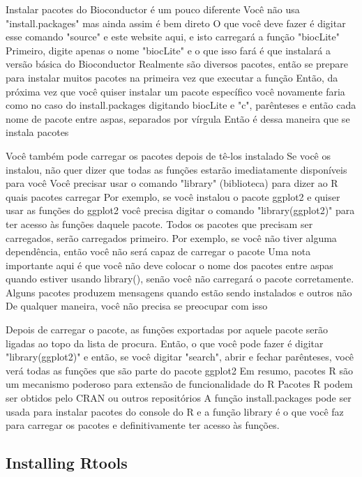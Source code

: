 Instalar pacotes do Bioconductor é um pouco diferente Você não usa "install.packages" mas ainda assim é bem direto O que você deve fazer é digitar esse comando "source" e este website aqui, e isto carregará a função "biocLite" Primeiro, digite apenas o nome "biocLite"  e o que isso fará é que instalará a versão básica do Bioconductor Realmente são diversos pacotes, então se prepare para instalar muitos pacotes na primeira vez que executar a função Então, da próxima vez que você quiser instalar um pacote específico você novamente faria como no caso do install.packages digitando biocLite e "c", parênteses e então cada nome de pacote entre aspas, separados por vírgula Então é dessa maneira que se instala pacotes 

Você também pode carregar os pacotes depois de tê-los instalado Se você os instalou, não quer dizer que todas as funções estarão imediatamente disponíveis para você Você precisar usar o comando "library" (biblioteca) para dizer ao R quais pacotes carregar Por exemplo, se você instalou o pacote ggplot2 e quiser usar as funções do ggplot2 você precisa digitar o comando "library(ggplot2)"  para ter acesso às funções daquele pacote. Todos os pacotes que precisam ser carregados, serão carregados primeiro. Por exemplo, se você não tiver alguma dependência, então você não será capaz de carregar o pacote Uma nota importante aqui é que você não deve colocar o nome dos pacotes entre aspas quando estiver usando library(), senão você não carregará o pacote corretamente. Alguns pacotes produzem mensagens quando estão sendo instalados e outros não De qualquer maneira, você não precisa se preocupar com isso 

Depois de carregar o pacote, as funções exportadas por aquele pacote serão ligadas ao topo da lista de procura. Então, o que você pode fazer é digitar "library(ggplot2)" e então, se você digitar "search", abrir e fechar parênteses, você verá todas as funções que são parte do pacote ggplot2 Em resumo, pacotes R são um mecanismo poderoso para extensão de funcionalidade do R Pacotes R podem ser obtidos pelo CRAN ou outros repositórios A função install.packages pode ser usada para instalar pacotes do console do R e a função library é o que você faz para carregar os pacotes e definitivamente ter acesso às funções. 


\subsection{Installing Rtools}


